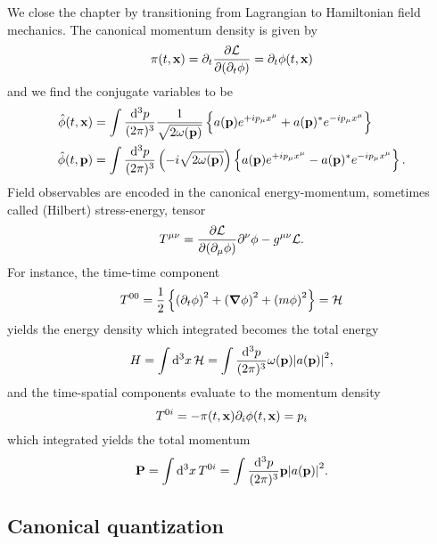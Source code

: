 We close the chapter by transitioning from Lagrangian to Hamiltonian field mechanics.
The canonical momentum density is given by
\begin{equation}
	\pi(t,\vb{x})
	=
	\partial_t\pdv{\mathcal{L}}{(\partial_t\phi)}
	=
	\partial_t\phi(t,\vb{x})
	\label{eq:canonical_momentum}
\end{equation}
and we find the conjugate variables to be
\begin{align}
	\hat\phi(t,\vb{x})
	&=
	\int\frac{\dd[3]{p}}{(2\pi)^3}
	\frac{1}{\sqrt{2\omega(\vb{p})}}
	\left\{
		a(\vb{p})
		e^{+ip_\mu x^\mu}
		+
		a(\vb{p})^*
		e^{-ip_\mu x^\mu}
	\right\}
	\label{eq:kg_pos}
	\\
	\hat\phi(t,\vb{p})
	&=
	\int\frac{\dd[3]{p}}{(2\pi)^3}
	\left(-i\sqrt{2\omega(\vb{p})}\right)
	\left\{
		a(\vb{p})
		e^{+ip_\mu x^\mu}
		-
		a(\vb{p})^*
		e^{-ip_\mu x^\mu}
	\right\}
	\label{eq:kg_mom}.
\end{align}
Field observables are encoded in the canonical energy-momentum, sometimes called (Hilbert) stress-energy, tensor
\begin{equation}
	T^{\mu\nu}
	=
	\pdv{\mathcal{L}}{(\partial_\mu\phi)}\partial^\nu\phi
	-
	g^{\mu\nu}\mathcal{L}
	\label{eq:energy_momentum_tensor}.
\end{equation}
For instance, the time-time component
\begin{equation}
	T^{00}
	=
	\frac{1}{2}
	\left\{
		\left(\partial_t\phi\right)^2
		+
		\left(\grad\phi\right)^2
		+
		\left(m\phi\right)^2
	\right\}
	=
	\mathcal{H}
	\label{eq:kg_energy_density}
\end{equation}
yields the energy density which integrated becomes the total energy
\begin{equation}
	H
	=
	\int\dd[3]{x}\mathcal{H}
	=
	\int\frac{\dd[3]{p}}{(2\pi)^3}
	\omega(\vb{p})\abs{a(\vb{p})}^2
	\label{eq:kg_total_energy},
\end{equation}
and the time-spatial components evaluate to the momentum density
\begin{equation}
	T^{0i}
	=
	-\pi(t,\vb{x})\partial_i\phi(t,\vb{x})
	=
	p_i
	\label{eq:kg_momentum_density}
\end{equation}
which integrated yields the total momentum
\begin{equation}
	\vb{P}
	=
	\int\dd[3]{x}T^{0i}
	=
	\int\frac{\dd[3]{p}}{(2\pi)^3}
	\vb{p}\abs{a(\vb{p})}^2
	\label{eq:kg_total_momentum}.
\end{equation}

\subsection{Canonical quantization}

